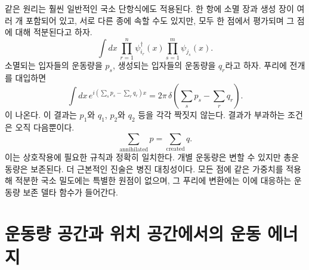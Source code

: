 \begin{classroomqa}\end{classroomqa}

같은 원리는 훨씬 일반적인 국소 단항식에도 적용된다. 한 항에 소멸 장과 생성 장이 여러 개 포함되어 있고, 서로 다른 종에 속할 수도 있지만, 모두 한 점에서 평가되며 그 점에 대해 적분된다고 하자.
\begin{equation}
\int dx\,
\prod_{r=1}^{n} \psi_{i_r}^\dagger(x)
\prod_{s=1}^{m} \psi_{j_s}(x).
\end{equation}
소멸되는 입자들의 운동량을 \(p_s\), 생성되는 입자들의 운동량을 \(q_r\)라고 하자. 푸리에 전개를 대입하면
\begin{equation}
\int dx\,
e^{i(\sum_s p_s-\sum_r q_r)x}
=2\pi\,
\delta\!\left(\sum_s p_s-\sum_r q_r\right).
\label{eq:l9-total-momentum-delta}
\end{equation}
이 나온다. 이 결과는 \(p_1\)와 \(q_1\), \(p_2\)와 \(q_2\) 등을 각각 짝짓지 않는다. 결과가 부과하는 조건은 오직 다음뿐이다.
\begin{equation}
\sum_{\mathrm{annihilated}}p
=
\sum_{\mathrm{created}}q.
\end{equation}
이는 상호작용에 필요한 규칙과 정확히 일치한다. 개별 운동량은 변할 수 있지만 총운동량은 보존된다. 더 근본적인 진술은 병진 대칭성이다. 모든 점에 같은 가중치를 적용해 적분한 국소 밀도에는 특별한 원점이 없으며, 그 푸리에 변환에는 이에 대응하는 운동량 보존 델타 함수가 들어간다.

\begin{classroomqa}\end{classroomqa}

\section{운동량 공간과 위치 공간에서의 운동 에너지}

